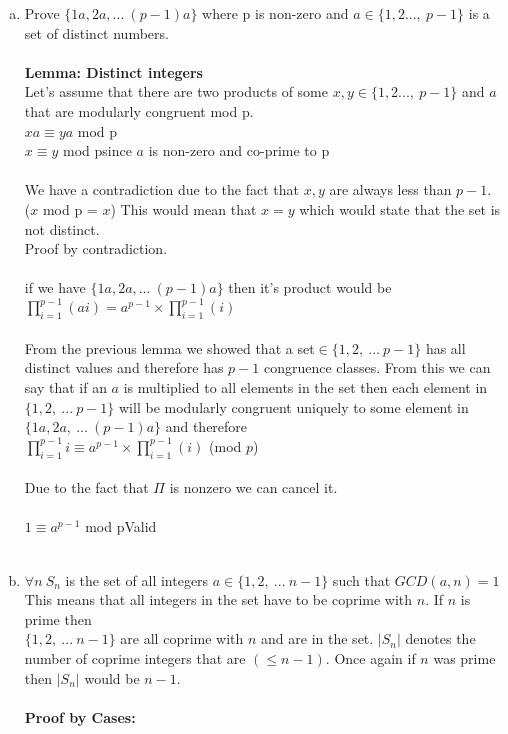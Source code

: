 \documentclass[11pt,letterpaper]{article}
\begin{document}
\begin{enumerate}[(a)]
\item
Prove $\{1a,2a, ... ~(p-1)a\}$ where p is non-zero and $a\in\{1, 2 ...,~p-1\}$ is a set of distinct numbers.\\\\

\textbf{Lemma: Distinct integers}\\
Let's assume that there are two products of some $x,y\in\{1, 2 ...,~p-1\}$ and $a$ that are modularly congruent mod p.\\
$xa\equiv ya$ mod p\\
$x\equiv y$ mod p\hfill since $a$ is non-zero and co-prime to p\\\\
We have a contradiction due to the fact that $x,y$ are always less than $p-1.$\\
($x$ mod p = $x$) This would mean that $x=y$ which would state that the set is not distinct.\\Proof by contradiction.\\\\
if we have $\{1a,2a, ... ~(p-1)a\}$ then it's product would be $\prod\limits_{i=1}^{p-1}(ai)=a^{p-1}\times\prod\limits_{i=1}^{p-1}(i)$\\\\
From the previous lemma we showed that a set$\in\{1,2,~...~p-1\}$ has all distinct values and therefore has $p-1$ congruence classes. From this we can say that if an $a$ is multiplied to all elements in the set then each element in $\{1,2,~...~p-1\}$ will be modularly congruent uniquely to some element in $\{1a,2a,~...~(p-1)a\}$ and therefore\\
$\prod\limits_{i=1}^{p-1}i\equiv a^{p-1}\times\prod\limits_{i=1}^{p-1}(i)$ (mod $p$)\\\\
Due to the fact that $\Pi$ is nonzero we can cancel it.\\\\
$1\equiv a^{p-1}$ mod p\hfill Valid\\\\
\clearpage

\item
$\forall n~S_n$ is the set of all integers $a\in \{1,2,~...~n-1\}$ such that $GCD(a,n) =1$\\
This means that all integers in the set have to be coprime with $n$. If $n$ is prime then\\ $\{1,2,~...~n-1\}$ are all coprime with $n$ and are in the set. $|S_n|$ denotes the number of coprime integers that are $(\leq n-1).$ Once again if $n$ was prime then $|S_n|$ would be $n-1.$\\
\\
\textbf{Proof by Cases:}\\


\end{enumerate}
\end{document}
